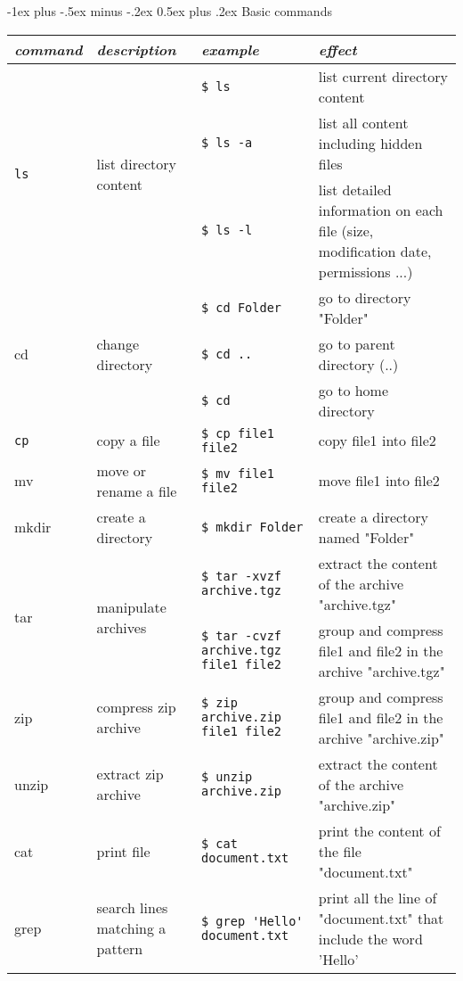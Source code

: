 \documentclass[10pt,landscape]{article}
\makeatletter
\renewcommand{\section}{\@startsection{section}{1}{0mm}%
	{-1ex plus -.5ex minus -.2ex}%
	{0.5ex plus .2ex}%
	{\normalfont\large\bfseries}}
\makeatother
\begin{document}
	\section{Basic commands}
\begin{tabular}{llll}
	\emph{command} & \emph{description} & \emph{example} & \emph{effect}\\
	\hline
	\multirow{3}{*}{\texttt{ls}} & 	\multirow{3}{*}{list directory content} & \verb!$ ls! & list current directory content\\ 
	& & \verb!$ ls -a!  & list all content including hidden files \\ 
	&	& \verb!$ ls -l!  & list detailed information on each file (size, modification date, permissions ...)\\ 			\hline
	\multirow{3}{*}{cd} & 	\multirow{3}{*}{change directory} & \verb!$ cd Folder! & go to directory "Folder"\\
	&		& \verb!$ cd .. ! & go to parent directory (..)\\
	&		& \verb!$ cd ! & go to home directory \\ \hline
	\multirow{1}{*}{\texttt{cp}} & 	\multirow{1}{*}{copy a file} & \verb!$ cp file1 file2! & copy file1 into file2 \\ 			\hline
	\multirow{1}{*}{mv} & move or rename a file & \verb!$ mv file1 file2! & move file1 into file2 \\ \hline
	\multirow{1}{*}{mkdir} & create a directory & \verb!$ mkdir Folder! & create a directory named "Folder" \\ \hline
	\multirow{2}{*}{tar} & \multirow{2}{*}{manipulate archives} & \verb!$ tar -xvzf archive.tgz! & extract the content of the archive "archive.tgz" \\
	& & \verb!$ tar -cvzf archive.tgz file1 file2! & group and compress file1 and file2 in the archive "archive.tgz" \\
	\hline
	\multirow{1}{*}{zip} & compress zip archive  & \verb!$ zip archive.zip  file1 file2 ! &  group and compress file1 and file2 in the archive "archive.zip" \\ \hline
	\multirow{1}{*}{unzip} & extract zip archive  & \verb!$ unzip archive.zip  ! &  extract the content of the archive "archive.zip" \\ \hline
	\multirow{1}{*}{cat} & print file  & \verb!$ cat document.txt  ! &  print the content of the file "document.txt" \\ \hline
	\multirow{1}{*}{grep} & search lines matching a pattern & \verb!$ grep 'Hello' document.txt  ! &  print all the line of "document.txt" that include the word 'Hello' \\ \hline
\end{tabular}

	\vfill
\end{document}
